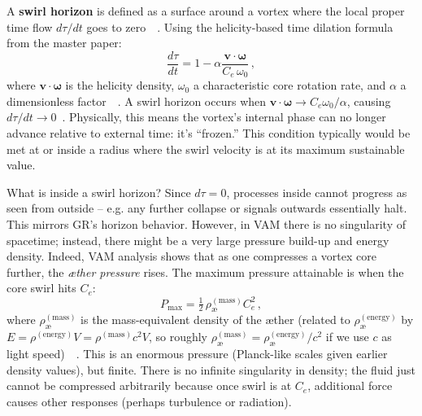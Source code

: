 \documentclass[preprint]{revtex4-2}
\begin{document}
    A \textbf{swirl horizon} is defined as a surface around a vortex where the local proper time flow $d\tau/dt$ goes to zero~\cite{reference_117}~\cite{reference_118}. Using the helicity-based time dilation formula from the master paper:
    \begin{equation}
        \frac{d\tau}{dt} = 1 - \alpha \frac{\mathbf{v}\cdot\boldsymbol{\omega}}{C_e\,\omega_0}\,,
        \label{eq:helicity-dilation}
    \end{equation}
    where $\mathbf{v}\cdot\boldsymbol{\omega}$ is the helicity density, $\omega_0$ a characteristic core rotation rate, and $\alpha$ a dimensionless factor~\cite{reference_119}~\cite{reference_120}. A swirl horizon occurs when $\mathbf{v}\cdot\boldsymbol{\omega} \to C_e \omega_0/\alpha$, causing $d\tau/dt \to 0$~\cite{reference_121}. Physically, this means the vortex’s internal phase can no longer advance relative to external time: it’s “frozen.” This condition typically would be met at or inside a radius where the swirl velocity is at its maximum sustainable value.

    What is inside a swirl horizon? Since $d\tau=0$, processes inside cannot progress as seen from outside – e.g. any further collapse or signals outwards essentially halt. This mirrors GR’s horizon behavior. However, in VAM there is no singularity of spacetime; instead, there might be a very large pressure build-up and energy density. Indeed, VAM analysis shows that as one compresses a vortex core further, the \emph{æther pressure} rises. The maximum pressure attainable is when the core swirl hits $C_e$:
    \begin{equation}
        P_{\max} = \tfrac{1}{2}\,\rho_{\text{\ae}}^{(\text{mass})} C_e^2\,,
        \label{eq:Pmax}
    \end{equation}
    where $\rho_{\text{\ae}}^{(\text{mass})}$ is the mass-equivalent density of the æther (related to $\rho_{\text{\ae}}^{(\text{energy})}$ by $E=\rho^{(\text{energy})}V = \rho^{(\text{mass})} c^2 V$, so roughly $\rho^{(\text{mass})}_{\text{\ae}} = \rho^{(\text{energy})}_{\text{\ae}}/c^2$ if we use $c$ as light speed)~\cite{reference_122}~\cite{reference_123}. This is an enormous pressure (Planck-like scales given earlier density values), but finite. There is no infinite singularity in density; the fluid just cannot be compressed arbitrarily because once swirl is at $C_e$, additional force causes other responses (perhaps turbulence or radiation).
\end{document}

